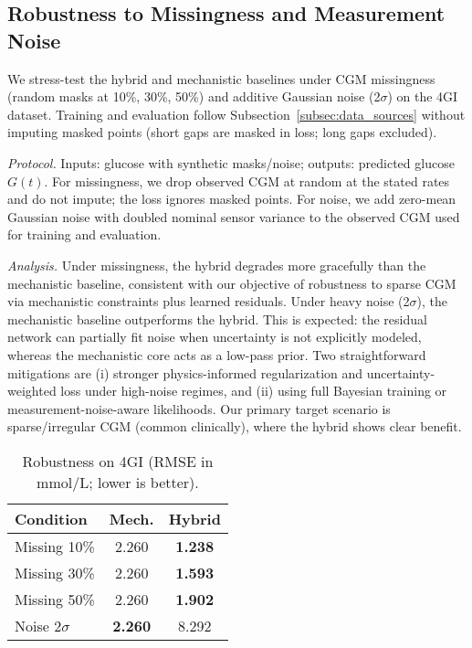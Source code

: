 \documentclass[9pt,shortpaper,twoside,web]{ieeecolor}
\begin{document}
\subsection{Robustness to Missingness and Measurement Noise}
\label{subsec:robustness}
We stress-test the hybrid and mechanistic baselines under CGM missingness (random masks at 10\%, 30\%, 50\%) and additive Gaussian noise (2$\sigma$) on the 4GI dataset. Training and evaluation follow Subsection~\ref{subsec:data_sources} without imputing masked points (short gaps are masked in loss; long gaps excluded).

\noindent\textit{Protocol.} Inputs: glucose with synthetic masks/noise; outputs: predicted glucose $G(t)$. For missingness, we drop observed CGM at random at the stated rates and do not impute; the loss ignores masked points. For noise, we add zero-mean Gaussian noise with doubled nominal sensor variance to the observed CGM used for training and evaluation.

\noindent\textit{Analysis.} Under missingness, the hybrid degrades more gracefully than the mechanistic baseline, consistent with our objective of robustness to sparse CGM via mechanistic constraints plus learned residuals. Under heavy noise (2$\sigma$), the mechanistic baseline outperforms the hybrid. This is expected: the residual network can partially fit noise when uncertainty is not explicitly modeled, whereas the mechanistic core acts as a low-pass prior. Two straightforward mitigations are (i) stronger physics-informed regularization and uncertainty-weighted loss under high-noise regimes, and (ii) using full Bayesian training or measurement-noise-aware likelihoods. Our primary target scenario is sparse/irregular CGM (common clinically), where the hybrid shows clear benefit.

\begin{table}[h]
\centering
\caption{Robustness on 4GI (RMSE in \si{mmol/L}; lower is better).}
\label{tab:robustness}
\begin{tabular}{lcc}
\toprule
Condition & Mech. & Hybrid \\
\midrule
Missing 10\% & 2.260 & \textbf{1.238} \\
Missing 30\% & 2.260 & \textbf{1.593} \\
Missing 50\% & 2.260 & \textbf{1.902} \\
Noise $2\sigma$ & \textbf{2.260} & 8.292 \\
\bottomrule
\end{tabular}
\end{table}
\end{document}
